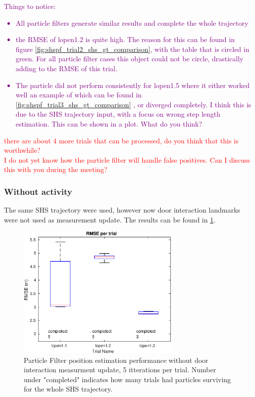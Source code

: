 \textcolor{purple}{
Things to notice:
\begin{itemize}
	\item All particle filters generate similar results and complete the whole trajectory
	\item the RMSE of lopen1.2 is quite high. The reason for this can be found in figure \cref{fig:shspf_trial2_shs_gt_comparison}, with the table that is circled in green. For all particle filter cases this object could not be circle, drastically adding to the RMSE of this trial.
	\item The particle did not perform consistently for lopen1.5 where it either worked well an example of which can be found in \cref{fig:shspf_trial3_shs_gt_comparison} , or diverged completely. I think this is due to the SHS trajectory input, with a focus on wrong step length estimation. This can be shown in a plot. What do you think?
\end{itemize}}

\textcolor{red}{there are about 4 more trials that can be processed, do you think that this is worthwhile?} \\
\textcolor{red}{I do not yet know how the particle filter will handle false positives. Can I discuss this with you during the meeting?}

\newpage
\subsubsection{Without activity}
The same SHS trajectory were used, however now door interaction landmarks were not used as measurement update. The results can be found in \cref{fig:pf_boxplot_no_doors}.

\begin{figure}[H]
	\centering
	\includegraphics[width=0.7\textwidth]{images/20201103_1128_with_doors_1}
	\caption[Particle Filter position estimation performance without door interaction]{Particle Filter position estimation performance without door interaction measurment update, 5 itterations per trial. Number under "completed" indicates how many trials had particles surviving for the whole SHS trajectory.}
	\label{fig:pf_boxplot_no_doors}
\end{figure}

